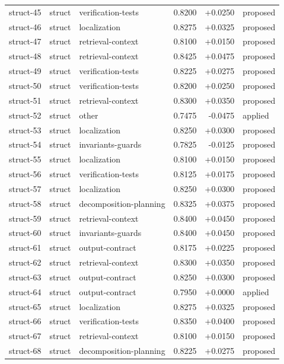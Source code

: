 \begin{center}
\begin{longtable}{llp{5.2cm}rrl}
struct-45 & struct & verification-tests & 0.8200 & +0.0250 & proposed \\
struct-46 & struct & localization & 0.8275 & +0.0325 & proposed \\
struct-47 & struct & retrieval-context & 0.8100 & +0.0150 & proposed \\
struct-48 & struct & retrieval-context & 0.8425 & +0.0475 & proposed \\
struct-49 & struct & verification-tests & 0.8225 & +0.0275 & proposed \\
struct-50 & struct & verification-tests & 0.8200 & +0.0250 & proposed \\
struct-51 & struct & retrieval-context & 0.8300 & +0.0350 & proposed \\
struct-52 & struct & other & 0.7475 & -0.0475 & applied \\
struct-53 & struct & localization & 0.8250 & +0.0300 & proposed \\
struct-54 & struct & invariants-guards & 0.7825 & -0.0125 & proposed \\
struct-55 & struct & localization & 0.8100 & +0.0150 & proposed \\
struct-56 & struct & verification-tests & 0.8125 & +0.0175 & proposed \\
struct-57 & struct & localization & 0.8250 & +0.0300 & proposed \\
struct-58 & struct & decomposition-planning & 0.8325 & +0.0375 & proposed \\
struct-59 & struct & retrieval-context & 0.8400 & +0.0450 & proposed \\
struct-60 & struct & invariants-guards & 0.8400 & +0.0450 & proposed \\
struct-61 & struct & output-contract & 0.8175 & +0.0225 & proposed \\
struct-62 & struct & retrieval-context & 0.8300 & +0.0350 & proposed \\
struct-63 & struct & output-contract & 0.8250 & +0.0300 & proposed \\
struct-64 & struct & output-contract & 0.7950 & +0.0000 & applied \\
struct-65 & struct & localization & 0.8275 & +0.0325 & proposed \\
struct-66 & struct & verification-tests & 0.8350 & +0.0400 & proposed \\
struct-67 & struct & retrieval-context & 0.8100 & +0.0150 & proposed \\
struct-68 & struct & decomposition-planning & 0.8225 & +0.0275 & proposed \\

\end{longtable}
\end{center}
